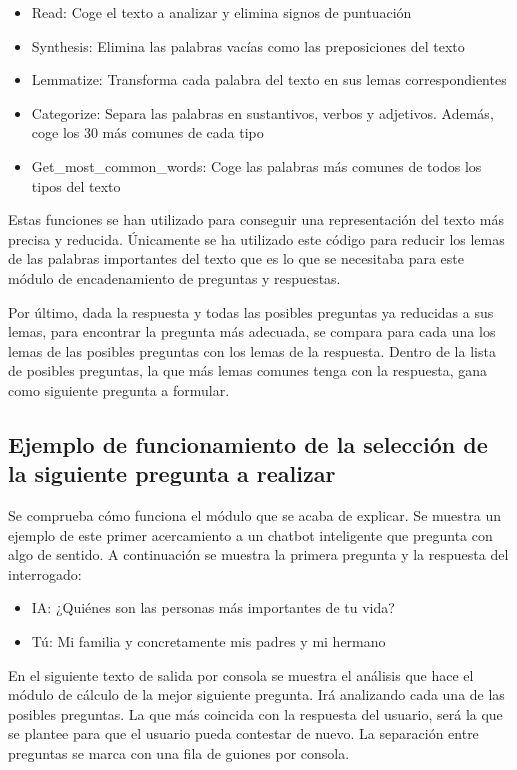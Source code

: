 \begin{itemize}
	\item Read: Coge el texto a analizar y elimina signos de puntuación
	\item Synthesis: Elimina las palabras vacías como las preposiciones del texto
	\item Lemmatize: Transforma cada palabra del texto en sus lemas correspondientes
	\item Categorize: Separa las palabras en sustantivos, verbos y adjetivos. Además, coge los 30 más comunes de cada tipo
	\item Get\_most\_common\_words: Coge las palabras más comunes de todos los tipos del texto
\end{itemize}

Estas funciones se han utilizado para conseguir una representación del texto más precisa y reducida. Únicamente se ha utilizado este código para reducir los lemas de las palabras importantes del texto que es lo que se necesitaba para este módulo de encadenamiento de preguntas y respuestas. 

Por último, dada la respuesta y todas las posibles preguntas ya reducidas a sus lemas, para encontrar la pregunta más adecuada, se compara para cada una los lemas de las posibles preguntas con los lemas de la respuesta. Dentro de la lista de posibles preguntas, la que más lemas comunes tenga con la respuesta, gana como siguiente pregunta a formular.

\subsection{Ejemplo de funcionamiento de la selección de la siguiente pregunta a realizar}

Se comprueba cómo funciona el módulo que se acaba de explicar. Se muestra un ejemplo de este primer acercamiento a un chatbot inteligente que pregunta con algo de sentido. A continuación se muestra la primera pregunta y la respuesta del interrogado:

\begin{itemize}
	\item[] IA: ¿Quiénes son las personas más importantes de tu vida?
	\item[] Tú: Mi familia y concretamente mis padres y mi hermano
\end{itemize}

En el siguiente texto de salida por consola se muestra el análisis que hace el módulo de cálculo de la mejor siguiente pregunta. Irá analizando cada una de las posibles preguntas. La que más coincida con la respuesta del usuario, será la que se plantee para que el usuario pueda contestar de nuevo. La separación entre preguntas se marca con una fila de guiones por consola.

